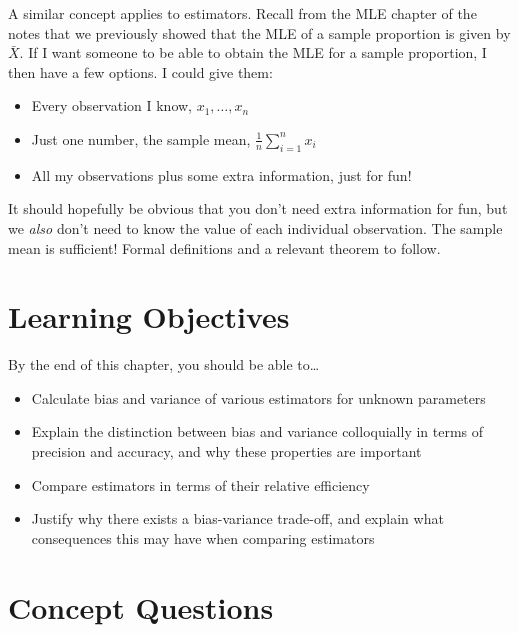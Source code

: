 \documentclass[
  letterpaper,
  DIV=11,
  numbers=noendperiod]{scrreprt}
\providecommand{\tightlist}{%
  \setlength{\itemsep}{0pt}\setlength{\parskip}{0pt}}\usepackage{longtable,booktabs,array}
\begin{document}
A similar concept applies to estimators. Recall from the MLE chapter of
the notes that we previously showed that the MLE of a sample proportion
is given by \(\bar{X}\). If I want someone to be able to obtain the MLE
for a sample proportion, I then have a few options. I could give them:

\begin{itemize}
\tightlist
\item
  Every observation I know, \(x_1, \dots,x_n\)
\item
  Just one number, the sample mean, \(\frac{1}{n}\sum_{i = 1}^n x_i\)
\item
  All my observations plus some extra information, just for fun!
\end{itemize}

It should hopefully be obvious that you don't need extra information for
fun, but we \emph{also} don't need to know the value of each individual
observation. The sample mean is sufficient! Formal definitions and a
relevant theorem to follow.

\section{Learning Objectives}\label{learning-objectives-3}

By the end of this chapter, you should be able to\ldots{}

\begin{itemize}
\item
  Calculate bias and variance of various estimators for unknown
  parameters
\item
  Explain the distinction between bias and variance colloquially in
  terms of precision and accuracy, and why these properties are
  important
\item
  Compare estimators in terms of their relative efficiency
\item
  Justify why there exists a bias-variance trade-off, and explain what
  consequences this may have when comparing estimators
\end{itemize}

\section{Concept Questions}\label{concept-questions-3}
\end{document}
